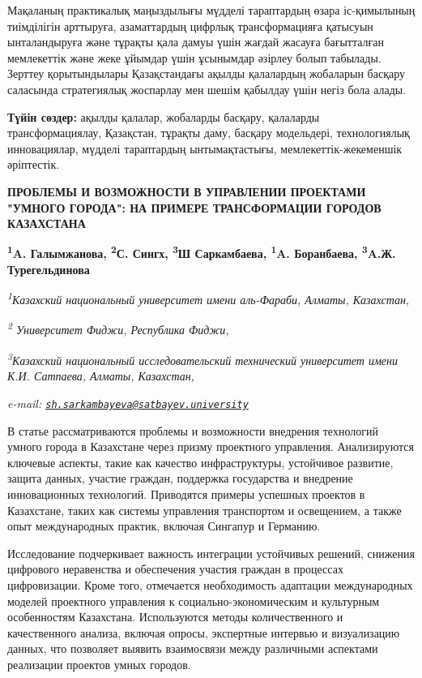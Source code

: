 Мақаланың практикалық маңыздылығы мүдделі тараптардың өзара іс-қимылының
тиімділігін арттыруға, азаматтардың цифрлық трансформацияға қатысуын
ынталандыруға және тұрақты қала дамуы үшін жағдай жасауға бағытталған
мемлекеттік және жеке ұйымдар үшін ұсынымдар әзірлеу болып табылады.
Зерттеу қорытындылары Қазақстандағы ақылды қалалардың жобаларын басқару
саласында стратегиялық жоспарлау мен шешім қабылдау үшін негіз бола
алады.

{\bfseries Түйін сөздер:} ақылды қалалар, жобаларды басқару, қалаларды
трансформациялау, Қазақстан, тұрақты даму, басқару модельдері,
технологиялық инновациялар, мүдделі тараптардың ынтымақтастығы,
мемлекеттік-жекеменшік әріптестік.

\begin{articleheader}
{\bfseries ПРОБЛЕМЫ И ВОЗМОЖНОСТИ В УПРАВЛЕНИИ ПРОЕКТАМИ "УМНОГО ГОРОДА": НА ПРИМЕРЕ ТРАНСФОРМАЦИИ ГОРОДОВ КАЗАХСТАНА}

{\bfseries
\textsuperscript{1}A. Галымжанова,
\textsuperscript{2}С. Сингх,
\textsuperscript{3}Ш Саркамбаева\textsuperscript{\envelope },
\textsuperscript{1}A. Боранбаева,
\textsuperscript{3}A.Ж. Турегельдинова}
\end{articleheader}

\begin{affiliation}
\emph{\textsuperscript{1}Казахский национальный университет имени аль-Фараби, Алматы, Казахстан,}

\emph{\textsuperscript{2} Университет Фиджи, Республика Фиджи,}

\emph{\textsuperscript{3}Казахский национальный исследовательский технический университет имени К.И. Сатпаева, Алматы, Казахстан,}

\emph{e-mail: \href{mailto:sh.sarkambayeva@satbayev.university}{\nolinkurl{sh.sarkambayeva@satbayev.university}}}
\end{affiliation}

В статье рассматриваются проблемы и возможности внедрения технологий
умного города в Казахстане через призму проектного управления.
Анализируются ключевые аспекты, такие как качество инфраструктуры,
устойчивое развитие, защита данных, участие граждан, поддержка
государства и внедрение инновационных технологий. Приводятся примеры
успешных проектов в Казахстане, таких как системы управления транспортом
и освещением, а также опыт международных практик, включая Сингапур и
Германию.

Исследование подчеркивает важность интеграции устойчивых решений,
снижения цифрового неравенства и обеспечения участия граждан в процессах
цифровизации. Кроме того, отмечается необходимость адаптации
международных моделей проектного управления к социально-экономическим и
культурным особенностям Казахстана. Используются методы количественного
и качественного анализа, включая опросы, экспертные интервью и
визуализацию данных, что позволяет выявить взаимосвязи между различными
аспектами реализации проектов умных городов.

